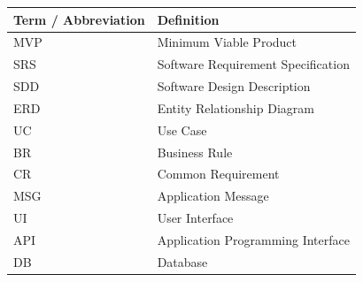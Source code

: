 
\renewcommand{\arraystretch}{1.3}
\begin{center}
\begin{tabular}{|l|p{9cm}|}
\hline
\textbf{Term / Abbreviation} & \textbf{Definition} \\
\hline
MVP & Minimum Viable Product \\
\hline
SRS & Software Requirement Specification \\
\hline
SDD & Software Design Description \\
\hline
ERD & Entity Relationship Diagram \\
\hline
UC & Use Case \\
\hline
BR & Business Rule \\
\hline
CR & Common Requirement \\
\hline
MSG & Application Message \\
\hline
UI & User Interface \\
\hline
API & Application Programming Interface \\
\hline
DB & Database \\
\hline
\end{tabular}
\end{center}